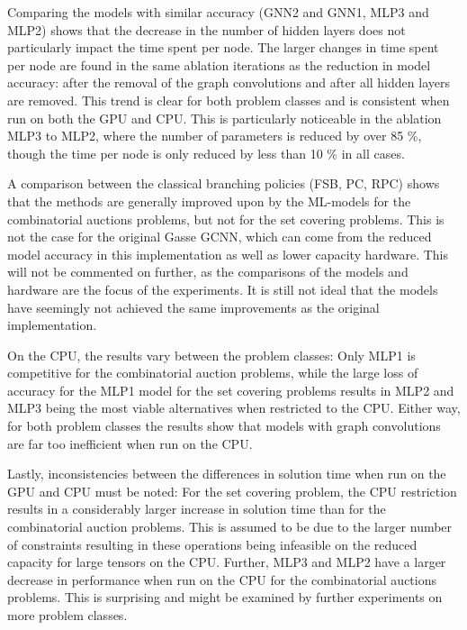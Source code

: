 Comparing the models with similar accuracy (GNN2 and GNN1, MLP3 and MLP2) shows that the decrease in the number of hidden layers does not particularly impact the time spent per node.  The larger changes in time spent per node are found in the same ablation iterations as the reduction in model accuracy: after the removal of the graph convolutions and after all hidden layers are removed. This trend is clear for both problem classes and is consistent when run on both the \gls{GPU} and \gls{CPU}. 
This is particularly noticeable in the ablation MLP3 to MLP2, where the number of parameters is reduced by over 85 \%, though the time per node is only reduced by less than 10 \% in all cases.

A comparison between the classical branching policies (\gls{FSB}, \gls{PC}, \gls{RPC}) shows that the methods are generally improved upon by the \gls{ML}-models for the combinatorial auctions problems, but not for the set covering problems. This is not the case for the original Gasse GCNN, which can come from the reduced model accuracy in this implementation as well as lower capacity hardware. This will not be commented on further, as the comparisons of the models and hardware are the focus of the experiments.
It is still not ideal that the models have seemingly not achieved the same improvements as the original implementation.

On the \gls{CPU}, the results vary between the problem classes: Only MLP1 is competitive for the combinatorial auction problems, while the large loss of accuracy for the MLP1 model for the set covering problems results in MLP2 and MLP3 being the most viable alternatives when restricted to the \gls{CPU}. Either way, for both problem classes the results show that models with graph convolutions are far too inefficient when run on the \gls{CPU}.  

Lastly, inconsistencies between the differences in solution time when run on the \gls{GPU} and \gls{CPU} must be noted: For the set covering problem, the \gls{CPU} restriction results in a considerably larger increase in solution time than for the combinatorial auction problems. This is assumed to be due to the larger number of constraints resulting in these operations being infeasible on the reduced capacity for large tensors on the \gls{CPU}. Further, MLP3 and MLP2 have a larger decrease in performance when run on the \gls{CPU} for the combinatorial auctions problems. This is surprising and might be examined by further experiments on more problem classes. 

